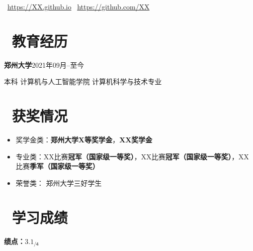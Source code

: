 \documentclass[11pt]{article}
\begin{document}
\centerline{\normalsize{ 
 \faExternalLink \ \href{https://XX.github.io}{https://XX.github.io} \quad
 \faGithubAlt \ \href{https://github.com/XX}{https://github.com/XX}
 }}
 \vspace{1.5ex}

\section{\texorpdfstring{\makebox[\widthof{\faGraduationCap}][c]{\color{ZZU_BLUE}\faGraduationCap}\ 教育经历}{教育经历}}

 {\bf 郑州大学}\hfill 2021年09月\hspace{0.5em}--\hspace{0.5em}至今

本科 \enspace 计算机与人工智能学院 \enspace 计算机科学与技术专业

\section{\texorpdfstring{\makebox[\widthof{\faTrophy}][c]{\color{ZZU_BLUE}\faTrophy}\ 获奖情况}{获奖情况}}
\begin{itemize}
    \item 奖学金类：{\bf 郑州大学X等奖学金}，{\bf XX奖学金}
    \item 专业类：XX比赛{\bf 冠军（国家级一等奖）}，XX比赛{\bf 冠军（国家级一等奖）}，XX比赛{\bf 季军（国家级一等奖）}
    \item 荣誉类： 郑州大学三好学生
\end{itemize}

\section{\texorpdfstring{\makebox[\widthof{\faFileText}][c]{\color{ZZU_BLUE}\faFileText}\ 学习成绩}{学习成绩}}
 {\bf 绩点：$\mathsf{3.1_{/4}}$}
\end{document}

